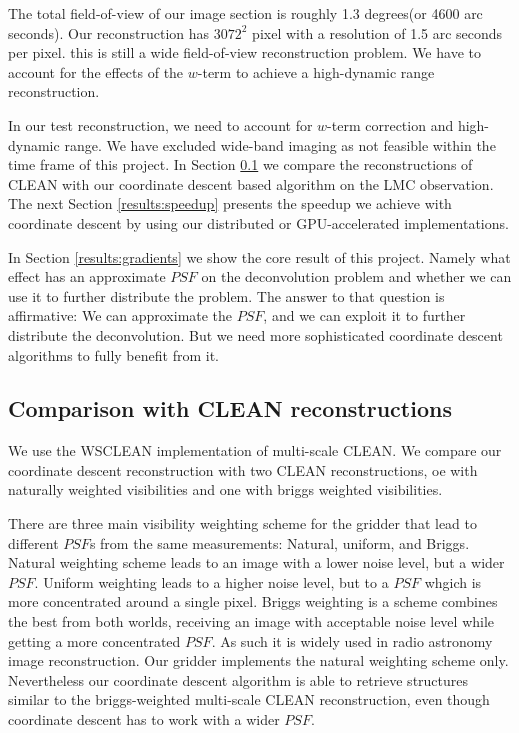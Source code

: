 The total field-of-view of our image section is roughly 1.3 degrees(or 4600 arc seconds). Our reconstruction has $3072^2$ pixel with a resolution of 1.5 arc seconds per pixel. this is still a wide field-of-view reconstruction problem. We have to account for the effects of the $w$-term to achieve a high-dynamic range reconstruction.

In our test reconstruction, we need to account for $w$-term correction and high-dynamic range. We have excluded wide-band imaging as not feasible within the time frame of this project. In Section \ref{results:cleancomp} we compare the reconstructions of CLEAN with our coordinate descent based algorithm on the LMC observation. The next Section \ref{results:speedup} presents the speedup we achieve with coordinate descent by using our distributed or GPU-accelerated implementations.

In Section \ref{results:gradients} we show the core result of this project. Namely what effect has an approximate $PSF$ on the deconvolution problem and whether we can use it to further distribute the problem. The answer to that question is affirmative: We can approximate the $PSF$, and we can exploit it to further distribute the deconvolution. But we need more sophisticated coordinate descent algorithms to fully benefit from it.


\subsection{Comparison with CLEAN reconstructions} \label{results:cleancomp}
We use the WSCLEAN \cite{offringa2014wsclean} implementation of multi-scale CLEAN. We compare our coordinate descent reconstruction with two CLEAN reconstructions, oe with naturally weighted visibilities and one with briggs weighted visibilities.

There are three main visibility weighting scheme for the gridder that lead to different $PSF$s from the same measurements: Natural, uniform, and Briggs\cite{briggsWeighting}. Natural weighting scheme leads to an image with a lower noise level, but a wider $PSF$. Uniform weighting leads to a higher noise level, but to a $PSF$ whgich is more concentrated around a single pixel. Briggs weighting is a scheme combines the best from both worlds, receiving an image with acceptable noise level while getting a more concentrated $PSF$. As such it is widely used in radio astronomy image reconstruction. Our gridder implements the natural weighting scheme only. Nevertheless our coordinate descent algorithm is able to retrieve structures similar to the briggs-weighted multi-scale CLEAN reconstruction, even though coordinate descent has to work with a wider $PSF$.


